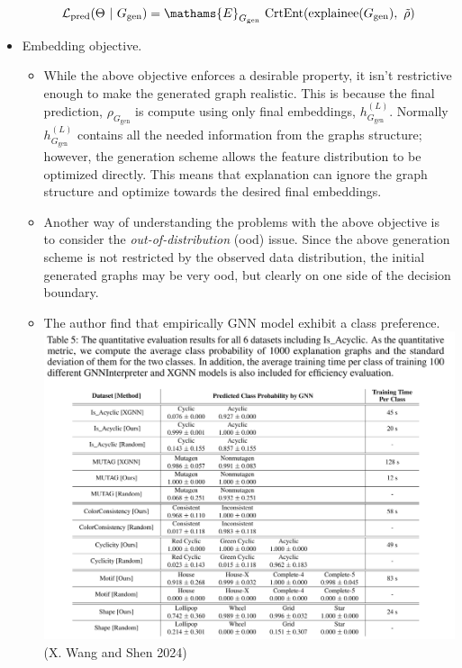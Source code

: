 \documentclass[
  11pt,
  letterpaper,
]{article}
\begin{document}
\begin{itemize}
  \begin{equation}
        \mathcal{L}_\text{pred} (\Theta \ | \ G_\text{gen}) = \mathams{E}_{G_\text{gen}} \ \text{CrtEnt} (\text{explainee}(G_\text{gen}), \ \tilde{\rho})
    \end{equation}
\item
  Embedding objective.

  \begin{itemize}
  \item
    While the above objective enforces a desirable property, it isn't
    restrictive enough to make the generated graph realistic. This is
    because the final prediction, \(\rho_{G_{\text{gen}}}\) is compute
    using only final embeddings, \(h^{(L)}_{G_{\text{gen}}}\). Normally
    \(h^{(L)}_{G_{\text{gen}}}\) contains all the needed information
    from the graphs structure; however, the generation scheme allows the
    feature distribution to be optimized directly. This means that
    explanation can ignore the graph structure and optimize towards the
    desired final embeddings.
  \item
    Another way of understanding the problems with the above objective
    is to consider the \emph{out-of-distribution} (ood) issue. Since the
    above generation scheme is not restricted by the observed data
    distribution, the initial generated graphs may be very ood, but
    clearly on one side of the decision boundary.
  \item
    The author find that empirically GNN model exhibit a class
    preference.\\
    \includegraphics{figures/random_baseline.png} (X. Wang and Shen
    2024)
  \end{itemize}


\end{itemize}
\end{document}
